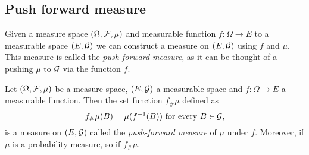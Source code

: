 %
%

\subsection{Push forward measure}

Given a measure space $(\Omega, \mathcal F, \mu)$ and measurable function $f : \Omega \to E$ to a measurable space $(E,\mathcal G)$ we can construct a measure on $(E,\mathcal G)$ using $f$ and $\mu$. This measure is called the \emph{push-forward measure}, as it can be thought of a pushing $\mu$ to $\mathcal G$ via the function $f$.

\begin{proposition}\label{prop:push_forward_measure}
Let $(\Omega, \mathcal F, \mu)$ be a measure space, $(E, \mathcal G)$ a measurable space and $f : \Omega \to E$ a measurable function. Then the set function $f_\# \mu$ defined as
\[
	f_\# \mu (B) = \mu(f^{-1}(B)) \text{ for every } B \in \mathcal G,
\]
is a measure on $(E, \mathcal G)$ called the \emph{push-forward measure} of $\mu$ under $f$. Moreover, if $\mu$ is a probability measure, so if $f_\# \mu$.
\end{proposition}

